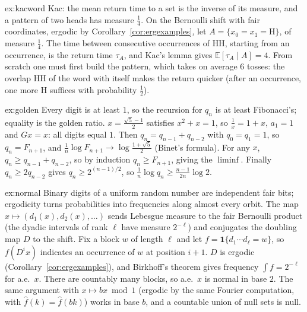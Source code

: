 \begin{solution}{ex:kacword}
\idea Kac: the mean return time to a set is the inverse of its measure, and a pattern of two heads has measure $\frac14$.
\writeup On the Bernoulli shift with fair coordinates, ergodic by Corollary~\ref{cor:ergexamples}, let $A=\{x_0=x_1=\mathrm H\}$, of measure $\frac14$. The time between consecutive occurrences of HH, starting from an occurrence, is the return time
$\tau_A$, and Kac's lemma gives $\mathbb E[\tau_A\mid A]=4$. From scratch one must first build the pattern, which takes on average $6$ tosses: the overlap HH of the word with itself makes the return quicker (after an occurrence,
one more H suffices with probability $\frac12$).
\end{solution}

\begin{solution}{ex:golden}
\idea Every digit is at least $1$, so the recursion for $q_n$ is at least Fibonacci's; equality is the golden ratio.
\writeup $x=\frac{\sqrt5-1}2$ satisfies $x^2+x=1$, so $\frac1x=1+x$, $a_1=1$ and $Gx=x$: all digits equal $1$. Then $q_n=q_{n-1}+q_{n-2}$ with $q_0=q_1=1$, so $q_n=F_{n+1}$, and $\frac1n\log F_{n+1}\to\log\frac{1+\sqrt5}2$ (Binet's formula). For any $x$,
$q_n\ge q_{n-1}+q_{n-2}$, so by induction $q_n\ge F_{n+1}$, giving the $\liminf$. Finally $q_n\ge2q_{n-2}$ gives $q_n\ge2^{(n-1)/2}$, so $\frac1n\log q_n\ge\frac{n-1}{2n}\log2$.
\end{solution}

\begin{solution}{ex:normal}
\idea Binary digits of a uniform random number are independent fair bits; ergodicity turns probabilities into frequencies along almost every orbit.
\writeup The map $x\mapsto(d_1(x),d_2(x),\dots)$ sends Lebesgue measure to the fair Bernoulli product (the dyadic intervals of rank $\ell$ have measure $2^{-\ell}$) and conjugates the doubling map $D$ to the shift. Fix a block $w$ of length $\ell$ and let
$f=\mathbf 1\{d_1\cdots d_\ell=w\}$, so $f(D^ix)$ indicates an occurrence of $w$ at position $i+1$. $D$ is ergodic (Corollary~\ref{cor:ergexamples}), and Birkhoff's theorem gives frequency $\int f=2^{-\ell}$ for a.e.\ $x$. There are countably many blocks, so a.e.\ $x$
is normal in base $2$. The same argument with $x\mapsto bx\bmod1$ (ergodic by the same Fourier computation, with $\hat f(k)=\hat f(bk)$) works in base $b$, and a countable union of null sets is null.
\end{solution}

